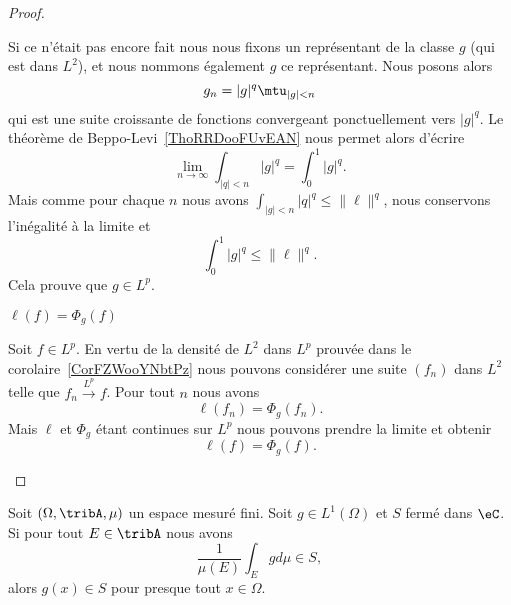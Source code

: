 \begin{proof}
\begin{subproof}
\begin{subproof}
                    Si ce n'était pas encore fait nous nous fixons un représentant de la classe \( g\) (qui est dans \( L^2\)), et nous nommons également \( g\) ce représentant. Nous posons alors
                    \begin{equation}
                        g_n=| g |^q\mtu_{| g |<n}
                    \end{equation}
                    qui est une suite croissante de fonctions convergeant ponctuellement vers \( | g |^q\). Le théorème de Beppo-Levi~\ref{ThoRRDooFUvEAN} nous permet alors d'écrire
                    \begin{equation}
                        \lim_{n\to \infty} \int_{| q |<n}| g |^q=\int_{0}^1| g |^q.
                    \end{equation}
                    Mais comme pour chaque \( n\) nous avons \( \int_{| g |<n}| q |^q\leq \| \ell \|^q\), nous conservons l'inégalité à la limite et
                    \begin{equation}
                        \int_0^1| g |^q\leq \| \ell \|^q.
                    \end{equation}
                    Cela prouve que \( g\in L^p\).

                \item[\( \ell(f)=\Phi_g(f)\)]

                    Soit \( f\in L^p\). En vertu de la densité de \( L^2\) dans \( L^p\) prouvée dans le corolaire~\ref{CorFZWooYNbtPz} nous pouvons considérer une suite \( (f_n)\) dans \( L^2\) telle que \( f_n\stackrel{L^p}{\longrightarrow}f\). Pour tout \( n\) nous avons
                    \begin{equation}
                        \ell(f_n)=\Phi_g(f_n).
                    \end{equation}
                    Mais \( \ell\) et \( \Phi_g\) étant continues sur \( L^p\) nous pouvons prendre la limite et obtenir
                    \begin{equation}
                        \ell(f)=\Phi_g(f).
                    \end{equation}
            \end{subproof}
        \end{subproof}
\end{proof}

\begin{lemma} \label{LemHNPEooHtMOGY}
    Soit \( (\Omega,\tribA,\mu)\) un espace mesuré fini. Soit \( g\in L^1(\Omega)\) et \( S\) fermé dans \( \eC\). Si pour tout \( E\in \tribA\) nous avons
    \begin{equation}
        \frac{1}{ \mu(E) }\int_Egd\mu\in S,
    \end{equation}
    alors \( g(x)\in S\) pour presque tout \( x\in \Omega\).
\end{lemma}


